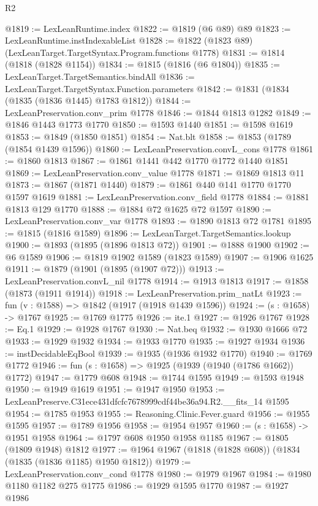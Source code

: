\begin{lexlean}{R2}
\begin{coremodule}
@1819 := LexLeanRuntime.index
@1822 := @1819 (@6 @89) @89
@1823 := LexLeanRuntime.instIndexableList
@1828 := @1822 (@1823 @89) (LexLeanTarget.TargetSyntax.Program.functions @1778)
@1831 := @1814 (@1818 (@1828 @1154))
@1834 := @1815 (@1816 (@6 @1804))
@1835 := LexLeanTarget.TargetSemantics.bindAll
@1836 := LexLeanTarget.TargetSyntax.Function.parameters
@1842 := @1831 (@1834 (@1835 (@1836 @1445) @1783 @1812))
@1844 := LexLeanPreservation.conv_prim @1778
@1846 := @1844 @1813 @1282
@1849 := @1846 @1443 @1773 @1770
@1850 := @1593 @1440
@1851 := @1598 @1619
@1853 := @1849 (@1850 @1851)
@1854 := Nat.blt
@1858 := @1853 (@1789 (@1854 @1439 @1596))
@1860 := LexLeanPreservation.convL_cons @1778
@1861 := @1860 @1813
@1867 := @1861 @1441 @442 @1770 @1772 @1440 @1851
@1869 := LexLeanPreservation.conv_value @1778
@1871 := @1869 @1813 @11
@1873 := @1867 (@1871 @1440)
@1879 := @1861 @440 @141 @1770 @1770 @1597 @1619
@1881 := LexLeanPreservation.conv_field @1778
@1884 := @1881 @1813 @129 @1770
@1888 := @1884 @72 @1625 @72 @1597
@1890 := LexLeanPreservation.conv_var @1778
@1893 := @1890 @1813 @72 @1781
@1895 := @1815 (@1816 @1589)
@1896 := LexLeanTarget.TargetSemantics.lookup
@1900 := @1893 (@1895 (@1896 @1813 @72))
@1901 := @1888 @1900
@1902 := @6 @1589
@1906 := @1819 @1902 @1589 (@1823 @1589)
@1907 := @1906 @1625
@1911 := @1879 (@1901 (@1895 (@1907 @72)))
@1913 := LexLeanPreservation.convL_nil @1778
@1914 := @1913 @1813
@1917 := @1858 (@1873 (@1911 @1914))
@1918 := LexLeanPreservation.prim_natLt
@1923 := fun (v : @1588) => @1842 (@1917 (@1918 @1439 @1596))
@1924 := (s : @1658) -> @1767
@1925 := @1769 @1775
@1926 := ite.{1}
@1927 := @1926 @1767
@1928 := Eq.{1}
@1929 := @1928 @1767
@1930 := Nat.beq
@1932 := @1930 @1666 @72
@1933 := @1929 @1932
@1934 := @1933 @1770
@1935 := @1927 @1934
@1936 := instDecidableEqBool
@1939 := @1935 (@1936 @1932 @1770)
@1940 := @1769 @1772
@1946 := fun (s : @1658) => @1925 (@1939 (@1940 (@1786 @1662)) @1772)
@1947 := @1779 @608
@1948 := @1744 @1595
@1949 := @1593 @1948
@1950 := @1949 @1619
@1951 := @1947 @1950
@1953 := LexLeanPreserve.C31ece431dfcfc7678999cdf44be36a94.R2.__fits_14 @1595
@1954 := @1785 @1953
@1955 := Reasoning.Clinic.Fever.guard
@1956 := @1955 @1595
@1957 := @1789 @1956
@1958 := @1954 @1957
@1960 := (s : @1658) -> @1951 @1958
@1964 := @1797 @608 @1950 @1958 @1185
@1967 := @1805 (@1809 @1948) @1812
@1977 := @1964 @1967 (@1818 (@1828 @608)) (@1834 (@1835 (@1836 @1185) @1950 @1812))
@1979 := LexLeanPreservation.conv_cond @1778
@1980 := @1979 @1967
@1984 := @1980 @1180 @1182 @275 @1775
@1986 := @1929 @1595 @1770
@1987 := @1927 @1986

\end{coremodule}
\end{lexlean}
